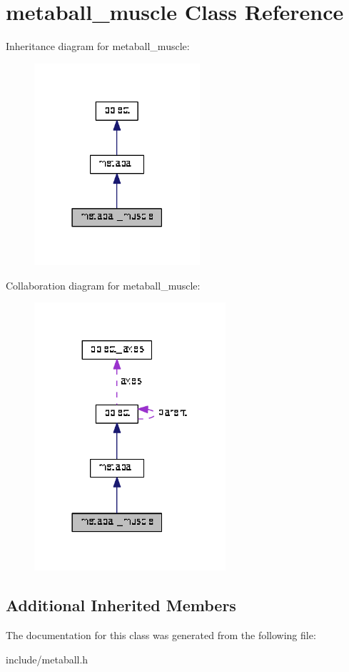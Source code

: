 \hypertarget{classmetaball__muscle}{}\section{metaball\+\_\+muscle Class Reference}
\label{classmetaball__muscle}


Inheritance diagram for metaball\+\_\+muscle\+:\nopagebreak
\begin{figure}[H]
\begin{center}
\leavevmode
\includegraphics[width=174pt]{classmetaball__muscle__inherit__graph}
\end{center}
\end{figure}


Collaboration diagram for metaball\+\_\+muscle\+:\nopagebreak
\begin{figure}[H]
\begin{center}
\leavevmode
\includegraphics[width=201pt]{classmetaball__muscle__coll__graph}
\end{center}
\end{figure}
\subsection*{Additional Inherited Members}


The documentation for this class was generated from the following file\+:\begin{DoxyCompactItemize}
\item 
include/metaball.\+h\end{DoxyCompactItemize}
